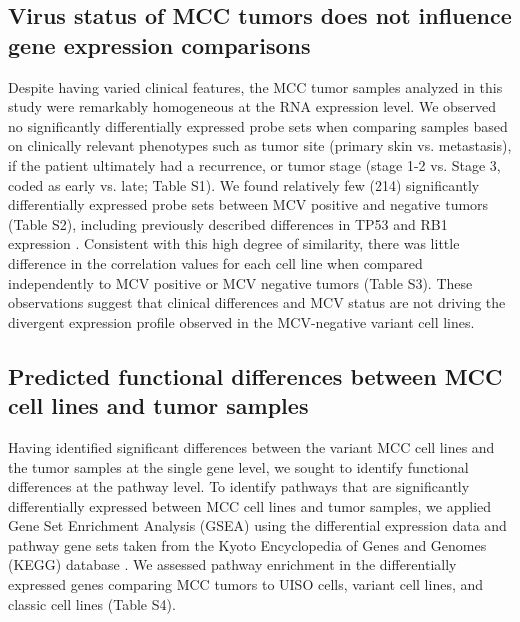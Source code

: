 \documentclass[10pt]{article}
\begin{document}
\subsection*{Virus status of MCC tumors does not influence gene expression comparisons}
Despite having varied clinical features, the MCC tumor samples analyzed in this study were remarkably homogeneous at the RNA expression level.
We observed no significantly differentially expressed probe sets when comparing samples based on clinically relevant phenotypes such as tumor site (primary skin vs. metastasis), if the patient ultimately had a recurrence, or tumor stage (stage 1-2 vs. Stage 3, coded as early vs. late; Table S1).
We found relatively few (214) significantly differentially expressed probe sets between MCV positive and negative tumors (Table S2), including previously described differences in TP53 and RB1 expression \citep{Harms2013Distinct,Sihto2011Merkel,Bhatia2010Merkel,Waltari2011Association}.
Consistent with this high degree of similarity, there was little difference in the correlation values for each cell line when compared independently to MCV positive or MCV negative tumors (Table S3).
These observations suggest that clinical differences and MCV status are not driving the divergent expression profile observed in the MCV-negative \citep{Guastafierro2013Characterization} variant cell lines.

\subsection*{Predicted functional differences between MCC cell lines and tumor samples}
Having identified significant differences between the variant MCC cell lines and the tumor samples at the single gene level, we sought to identify functional differences at the pathway level.
To identify pathways that are significantly differentially expressed between MCC cell lines and tumor samples, we applied Gene Set Enrichment Analysis (GSEA) \citep{Subramanian2005Gene} using the differential expression data and pathway gene sets taken from the Kyoto Encyclopedia of Genes and Genomes (KEGG) database \citep{Kanehisa2000KEGG}.
We assessed pathway enrichment in the differentially expressed genes comparing MCC tumors to UISO cells, variant cell lines, and classic cell lines (Table S4).
\end{document}
